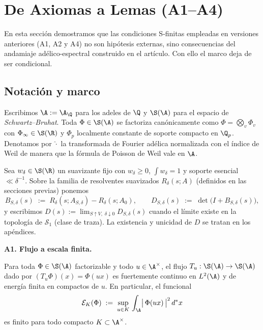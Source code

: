 \section{De Axiomas a Lemas (A1--A4)}

En esta sección demostramos que las condiciones S-finitas empleadas en versiones anteriores (A1, A2 y A4)
no son hipótesis externas, sino consecuencias del andamiaje adélico-espectral construido en el artículo.
Con ello el marco deja de ser condicional.

\subsection*{Notación y marco}
Escribimos $\A := \A_\Q$ para los adeles de $\Q$ y $\S(\A)$ para el espacio de \emph{Schwartz--Bruhat}.
Toda $\Phi\in \S(\A)$ se factoriza canónicamente como $\Phi=\bigotimes_v \Phi_v$ con $\Phi_\infty\in \S(\R)$
y $\Phi_p$ localmente constante de soporte compacto en $\Q_p$.
Denotamos por $\widehat{\cdot}$ la transformada de Fourier adélica normalizada con el
índice de Weil de manera que la fórmula de Poisson de Weil vale en $\A$.

\medskip

Sea $w_\delta\in \S(\R)$ un suavizante fijo con $w_\delta\ge 0$, $\int w_\delta=1$ y soporte esencial $\ll \delta^{-1}$.
Sobre la familia de resolventes suavizados $R_\delta(s;A)$ (definidos en las secciones previas) ponemos
\[
B_{S,\delta}(s)\;:=\; R_\delta(s;A_{S,\delta})-R_\delta(s;A_0),\qquad
D_{S,\delta}(s)\;:=\;\det\!\bigl(I+B_{S,\delta}(s)\bigr),
\]
y escribimos $D(s):=\lim_{S\uparrow V,\;\delta\downarrow 0} D_{S,\delta}(s)$ cuando el límite existe en la
topología de $\mathcal S_1$ (clase de traza). La existencia y unicidad de $D$ se tratan en los apéndices.

\bigskip
\noindent\textbf{A1. Flujo a escala finita.}

\begin{lemma}\label{lem:A1}
Para toda $\Phi\in \S(\A)$ factorizable y todo $u\in \A^\times$, el flujo
$T_u:\S(\A)\to \S(\A)$ dado por $(T_u\Phi)(x)=\Phi(ux)$ es fuertemente continuo en $L^2(\A)$
y de energía finita en compactos de $u$. En particular, el funcional
\[
\mathcal E_K(\Phi)\;:=\;\sup_{u\in K}\,\int_{\A} \bigl|\,\Phi(ux)\,\bigr|^2\,d^\ast x
\]
es finito para todo compacto $K\subset \A^\times$.
\end{lemma}

